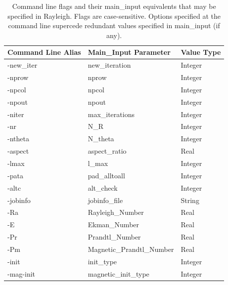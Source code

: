 \begin{table}
\centering
\begin{tabular} {|l | l | l |}
\hline
Command Line Alias & Main\_Input Parameter & Value Type  \\
\hline
 -new\_iter  & new\_iteration            & Integer \\
 -nprow      & nprow                     & Integer\\
 -npcol      & npcol                     & Integer  \\
 -npout      & npout                     & Integer \\
 -niter      & max\_iterations           & Integer  \\
 -nr         & N\_R                      & Integer\\
 -ntheta     & N\_theta                  & Integer   \\
 -aspect     & aspect\_ratio             & Real \\
 -lmax       & l\_max                    & Integer   \\
 -pata       & pad\_alltoall             & Integer  \\
 -altc       & alt\_check                & Integer \\
  -jobinfo   & jobinfo\_file             & String \\
 -Ra         & Rayleigh\_Number          & Real \\
 -E          & Ekman\_Number             & Real \\
 -Pr         & Prandtl\_Number           & Real \\
 -Pm         & Magnetic\_Prandtl\_Number & Real \\
 -init       & init\_type                & Integer \\
 -mag-init   & magnetic\_init\_type      & Integer \\
\hline
\end{tabular}
\caption{\label{table:cmd_opt} Command line flags and their main\_input equivalents that may be specified in Rayleigh.  Flags are case-sensitive.  Options specified at the command line supercede redundant values specified in main\_input (if any).}
\end{table}


